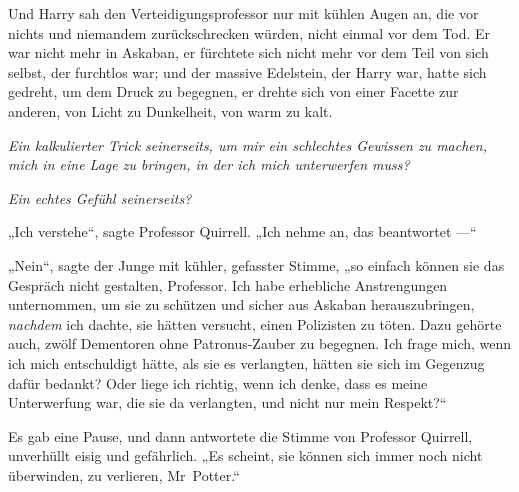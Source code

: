 Und Harry sah den Verteidigungsprofessor nur mit kühlen Augen an, die vor nichts und niemandem zurückschrecken würden, nicht einmal vor dem Tod. Er war nicht mehr in Askaban, er fürchtete sich nicht mehr vor dem Teil von sich selbst, der furchtlos war; und der massive Edelstein, der Harry war, hatte sich gedreht, um dem Druck zu begegnen, er drehte sich von einer Facette zur anderen, von Licht zu Dunkelheit, von warm zu kalt.

\emph{Ein kalkulierter Trick seinerseits, um mir ein schlechtes Gewissen zu machen, mich in eine Lage zu bringen, in der ich mich unterwerfen muss?}

\emph{Ein echtes Gefühl seinerseits?}

„Ich verstehe“, sagte Professor Quirrell.
„Ich nehme an, das beantwortet —“

„Nein“, sagte der Junge mit kühler, gefasster Stimme, „so einfach können sie das Gespräch nicht gestalten, Professor. Ich habe erhebliche Anstrengungen unternommen, um sie zu schützen und sicher aus Askaban herauszubringen, \emph{nachdem} ich dachte, sie hätten versucht, einen Polizisten zu töten. Dazu gehörte auch, zwölf Dementoren ohne Patronus-Zauber zu begegnen. Ich frage mich, wenn ich mich entschuldigt hätte, als sie es verlangten, hätten sie sich im Gegenzug dafür bedankt? Oder liege ich richtig, wenn ich denke, dass es meine Unterwerfung war, die sie da verlangten, und nicht nur mein Respekt?“

Es gab eine Pause, und dann antwortete die Stimme von Professor Quirrell, unverhüllt eisig und gefährlich.
„Es scheint, sie können sich immer noch nicht überwinden, zu verlieren, Mr~Potter.“

